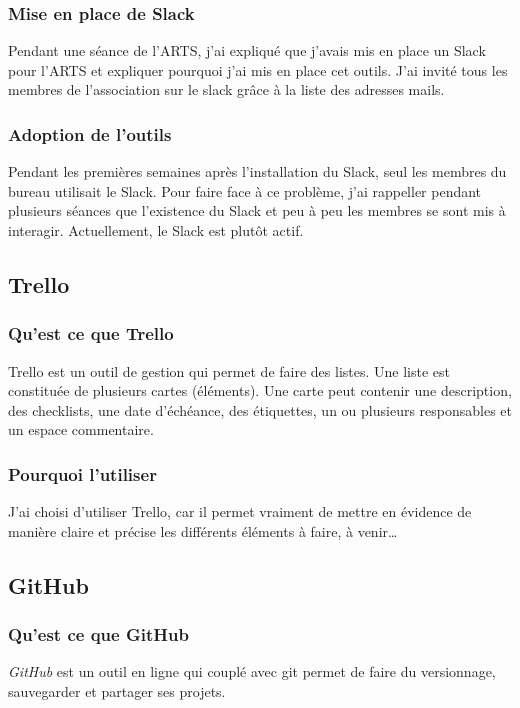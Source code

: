 \documentclass[11pt,a4paper]{report}
\begin{document}
      \subsubsection{Mise en place de Slack}
        Pendant une séance de l'ARTS, j'ai expliqué que j'avais mis en place un Slack pour l'ARTS et expliquer pourquoi j'ai mis en place cet outils.
        J'ai invité tous les membres de l'association sur le slack grâce à la liste des adresses mails.

      \subsubsection{Adoption de l'outils}
        Pendant les premières semaines après l'installation du Slack, seul les membres du bureau utilisait le Slack. Pour faire face à ce problème, j'ai rappeller pendant plusieurs séances que l'existence du Slack et peu à peu les membres se sont mis à interagir.
        Actuellement, le Slack est plut\^ot actif.

    \subsection{Trello}
      \subsubsection{Qu'est ce que Trello}
        Trello est un outil de gestion qui permet de faire des listes. Une liste est constituée de plusieurs cartes (éléments). Une carte peut contenir une description, des checklists, une date d'échéance, des étiquettes, un ou plusieurs responsables et un espace commentaire.

      \subsubsection{Pourquoi l'utiliser}
        J'ai choisi d'utiliser Trello, car il permet vraiment de mettre en évidence de manière claire et précise les différents éléments à faire, à venir…

    \subsection{GitHub}
      \subsubsection{Qu'est ce que GitHub}
        \emph{GitHub} est un outil en ligne qui couplé avec git permet de faire du versionnage, sauvegarder et partager ses projets.
\end{document}
